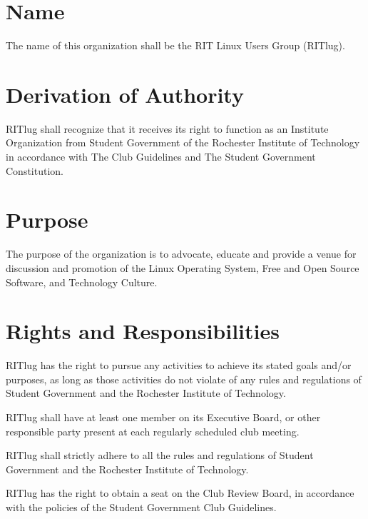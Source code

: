 



\section{Name}
The name of this organization shall be the RIT Linux Users Group (RITlug).

\section{Derivation of Authority}
RITlug shall recognize that it receives its right to function as an Institute Organization from Student Government of the Rochester Institute of Technology in accordance with The Club Guidelines and The Student Government Constitution.

\section{Purpose}
The purpose of the organization is to advocate, educate and provide a venue for discussion and promotion of the Linux Operating System, Free and Open Source Software, and Technology Culture.

\section{Rights and Responsibilities}
\begin{subroutines}
\item RITlug has the right to pursue any activities to achieve its stated goals and/or purposes, as long as those activities do not violate of any rules and regulations of Student Government and the Rochester Institute of Technology.
\item RITlug shall have at least one member on its Executive Board, or other responsible party present at each regularly scheduled club meeting.
\item RITlug shall strictly adhere to all the rules and regulations of Student Government and the Rochester Institute of Technology.
\item RITlug has the right to obtain a seat on the Club Review Board, in accordance with the policies of the Student Government Club Guidelines.
\end{subroutines}


